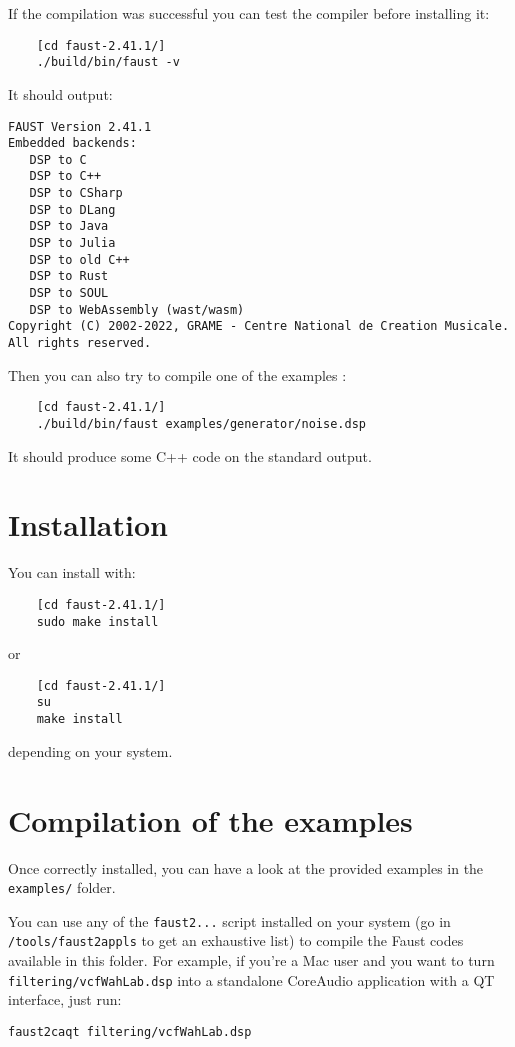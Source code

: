 If the compilation was successful you can test the compiler before installing it:
\begin{lstlisting}
	[cd faust-2.41.1/]
	./build/bin/faust -v
\end{lstlisting}
It should output:
\begin{lstlisting}
FAUST Version 2.41.1
Embedded backends: 
   DSP to C
   DSP to C++
   DSP to CSharp
   DSP to DLang
   DSP to Java
   DSP to Julia
   DSP to old C++
   DSP to Rust
   DSP to SOUL
   DSP to WebAssembly (wast/wasm)
Copyright (C) 2002-2022, GRAME - Centre National de Creation Musicale. All rights reserved. 
\end{lstlisting}

Then you can also try to compile one of the examples :
\begin{lstlisting}
	[cd faust-2.41.1/]
	./build/bin/faust examples/generator/noise.dsp
\end{lstlisting}
It should produce some C++ code on the standard output.

\section{Installation}
You can install \faust with:
\begin{lstlisting}
	[cd faust-2.41.1/]
	sudo make install
\end{lstlisting}
or
\begin{lstlisting}
	[cd faust-2.41.1/]
	su
	make install
\end{lstlisting}
depending on your system.

\section{Compilation of the examples}

Once \faust correctly installed, you can have a look at the provided examples in the \lstinline'examples/' folder. 

You can use any of the \lstinline'faust2...' script installed on your system (go in \lstinline'/tools/faust2appls' to get an exhaustive list) to compile the Faust codes available in this folder. For example, if you're a Mac user and you want to turn \lstinline'filtering/vcfWahLab.dsp' into a standalone CoreAudio application with a QT interface, just run:

\lstinline'faust2caqt filtering/vcfWahLab.dsp'

